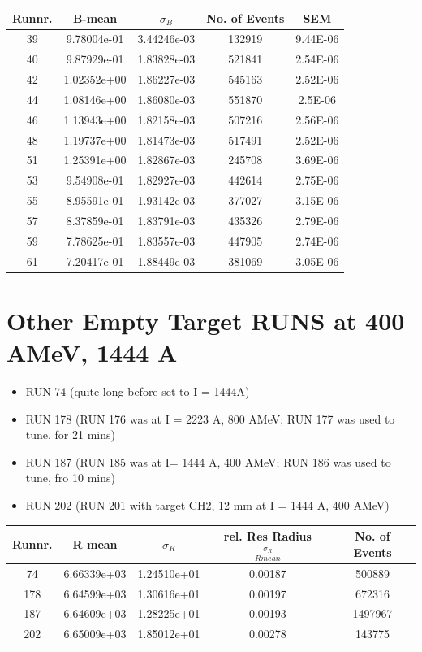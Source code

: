 \documentclass[12pt, letterpaper]{article}
\begin{document}
\begin{tabular}{|c|c|c|c|c|}
\hline
Runnr. & B-mean & $\sigma_{B}$ & No. of Events & SEM \\
\hline
39		&	9.78004e-01 &	3.44246e-03	&	132919	& 9.44E-06 \\
40		&	9.87929e-01	&	1.83828e-03	&	521841	& 2.54E-06 \\
42		&	1.02352e+00	&	1.86227e-03	&	545163	& 2.52E-06 \\
44		& 	1.08146e+00	&	1.86080e-03 &	551870	& 2.5E-06\\
46		&	1.13943e+00	&	1.82158e-03	& 	507216	& 2.56E-06\\
48		&	1.19737e+00	&	1.81473e-03	&	517491	& 2.52E-06\\
51		&	1.25391e+00 &	1.82867e-03	&	245708	& 3.69E-06\\
53		&	9.54908e-01	&	1.82927e-03	&	442614	& 2.75E-06\\
55		&	8.95591e-01	&	1.93142e-03	&	377027	& 3.15E-06\\
57		& 	8.37859e-01	&	1.83791e-03	&	435326	& 2.79E-06\\
59		&   7.78625e-01	&	1.83557e-03	&	447905	& 2.74E-06\\
61		&	7.20417e-01	&	1.88449e-03	&	381069	& 3.05E-06\\

\hline

\end{tabular}

\section{Other Empty Target RUNS at 400 AMeV, 1444 A}
\begin{itemize}
\item RUN 74 (quite long before set to I = 1444A)
\item RUN 178 (RUN 176 was at I = 2223 A, 800 AMeV; RUN 177 was used to tune, for 21 mins)
\item RUN 187 (RUN 185 was at I= 1444 A, 400 AMeV; RUN 186 was used to tune, fro 10 mins)
\item RUN 202 (RUN 201 with target CH2, 12 mm at I = 1444 A, 400 AMeV)
\end{itemize}

\begin{tabular}{|c|c|c|c|c|}
\hline
Runnr. & R mean & $\sigma_{R}$ & rel. Res Radius $\frac{\sigma_{R}}{R mean}$ & No. of Events\\
\hline
74		&	 6.66339e+03	&	1.24510e+01	& 0.00187 &	500889 \\
178		&	6.64599e+03	&	1.30616e+01	& 0.00197 &  672316	 \\
187 		&	6.64609e+03	&	1.28225e+01	& 0.00193 & 1497967	 \\
202		&	 6.65009e+03	&	1.85012e+01	& 0.00278 & 143775 	 \\


\hline

\end{tabular}
\end{document}
